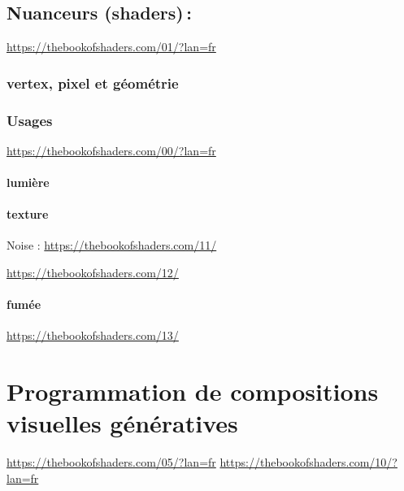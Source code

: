 \documentclass[
]{book}
\begin{document}
\hypertarget{nuanceurs-shaders}{%
\subsection{Nuanceurs (shaders)\,:}\label{nuanceurs-shaders}}

\url{https://thebookofshaders.com/01/?lan=fr}

\hypertarget{vertex-pixel-et-guxe9omuxe9trie}{%
\subsubsection{vertex, pixel et géométrie}\label{vertex-pixel-et-guxe9omuxe9trie}}

\hypertarget{usages}{%
\subsubsection{Usages}\label{usages}}

\url{https://thebookofshaders.com/00/?lan=fr}

\hypertarget{lumiuxe8re}{%
\paragraph{lumière}\label{lumiuxe8re}}

\hypertarget{texture-1}{%
\paragraph{texture}\label{texture-1}}

Noise : \url{https://thebookofshaders.com/11/}

\url{https://thebookofshaders.com/12/}

\hypertarget{fumuxe9e}{%
\paragraph{fumée}\label{fumuxe9e}}

\url{https://thebookofshaders.com/13/}

\hypertarget{programmation-de-compositions-visuelles-guxe9nuxe9ratives}{%
\section{Programmation de compositions visuelles génératives}\label{programmation-de-compositions-visuelles-guxe9nuxe9ratives}}

\url{https://thebookofshaders.com/05/?lan=fr}
\url{https://thebookofshaders.com/10/?lan=fr}
\end{document}

